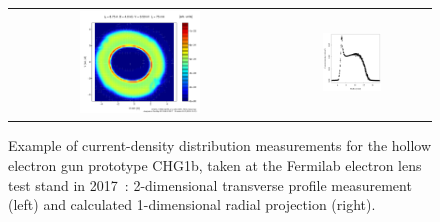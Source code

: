 \documentclass[
prstab
,reprint
,linenumbers
,longbibliography
,preprintnumbers
,showkeys
,amsfonts,amssymb,amsmath
,floatfix
]{revtex4-1}
\begin{document}
\begin{figure}
  \begin{tabular}{cc}
    \includegraphics[width=0.48\textwidth]{CHG1b_170523_8p75A_2-4-2kG_500V_75mA_hires_2D} &
    \includegraphics[width=0.4\textwidth]{CHG1b_170523_8p75A_2-4-2kG_500V_75mA_hires_j-vs-r_binned_nogrid_nolabel}\\
  \end{tabular}
  \caption{Example of current-density distribution measurements for
    the hollow electron gun prototype CHG1b, taken at the Fermilab
    electron lens test stand in
    2017~\cite{hel_res_field_stancari_2017}: 2-dimensional transverse
    profile measurement (left) and calculated 1-dimensional radial
    projection (right).}
  \label{core:fig:0}
\end{figure}
\end{document}
